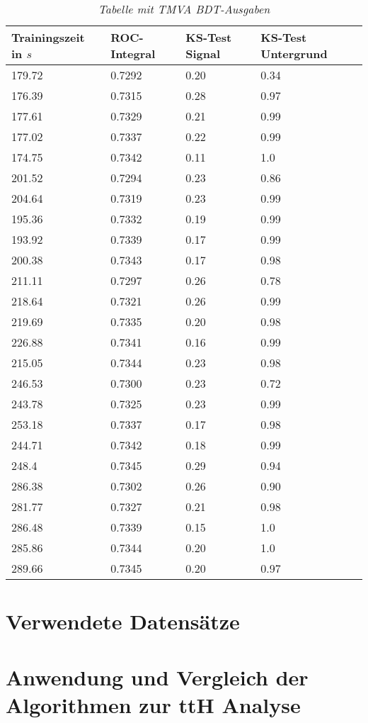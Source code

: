 \begin{table}[hhh]\parbox{12cm}{
  \caption[TMVA 6j4t Ergebnisse]{\it Tabelle mit TMVA BDT-Ausgaben}%
  }\label{tab:tmva}
  \begin{center}
  \begin{tabular}{llll}
  \hline
  Trainingszeit in $s$ & ROC-Integral & KS-Test Signal & KS-Test Untergrund\\
  \hline
  \hline
179.72 & 0.7292 & 0.20 & 0.34\\ 
176.39 & 0.7315 & 0.28 & 0.97\\ 
177.61 & 0.7329 & 0.21 & 0.99\\ 
177.02 & 0.7337 & 0.22 & 0.99\\ 
174.75 & 0.7342 & 0.11 & 1.0\\ 
201.52 & 0.7294 & 0.23 & 0.86\\ 
204.64 & 0.7319 & 0.23 & 0.99\\ 
195.36 & 0.7332 & 0.19 & 0.99\\ 
193.92 & 0.7339 & 0.17 & 0.99\\ 
200.38 & 0.7343 & 0.17 & 0.98\\ 
211.11 & 0.7297 & 0.26 & 0.78\\ 
218.64 & 0.7321 & 0.26 & 0.99\\ 
219.69 & 0.7335 & 0.20 & 0.98\\ 
226.88 & 0.7341 & 0.16 & 0.99\\ 
215.05 & 0.7344 & 0.23 & 0.98\\ 
246.53 & 0.7300 & 0.23 & 0.72\\ 
243.78 & 0.7325 & 0.23 & 0.99\\
253.18 & 0.7337 & 0.17 & 0.98\\ 
244.71 & 0.7342 & 0.18 & 0.99\\ 
248.4  & 0.7345 & 0.29 & 0.94\\ 
286.38 & 0.7302 & 0.26 & 0.90\\ 
281.77 & 0.7327 & 0.21 & 0.98\\ 
286.48 & 0.7339 & 0.15 & 1.0\\ 
285.86 & 0.7344 & 0.20 & 1.0\\ 
289.66 & 0.7345 & 0.20 & 0.97\\ 
  \hline
  \end{tabular}
  \end{center}
\end{table}

\section{Verwendete Datens\"atze}
\label{ch:Vergleich:sec:Daten}

\section{Anwendung und Vergleich der Algorithmen zur ttH Analyse}
\label{ch:Vergleich:sec:ttH}

